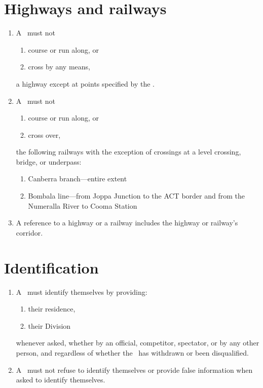 \documentclass[12pt]{report}
\begin{document}
  \section{Highways and railways}\label{sec:highways}
  \begin{enumerate}
    \item A \team\ must not
    \begin{enumerate}
      \item  course or run along, or
      \item cross by any means,
    \end{enumerate}  a highway except at points specified by the \RaceDirector.
    \item A \team\ must not \begin{enumerate}
      \item  course or run along, or
      \item cross over,
    \end{enumerate} the following railways with the exception of crossings at a level crossing, bridge, or underpass:
    \begin{enumerate}
    \item Canberra branch---entire extent
      \item Bombala  line---from Joppa Junction to the ACT border and from the Numeralla River to Cooma Station
    \end{enumerate}
    \item A reference to a highway or a railway includes the highway or railway's corridor.
  \end{enumerate}
  \section{Identification}
  \begin{enumerate}
    \item A \team\ must identify themselves by providing:
    \begin{enumerate}
      \item their residence,
      \item their Division
    \end{enumerate}
    whenever asked, whether by an official, competitor, spectator, or by any other person, and regardless of whether the \team\ has withdrawn or been disqualified. \amended

    \item A \team\ must not refuse to identify themselves or provide false information when asked to identify themselves.

  \end{enumerate}
\end{document}
